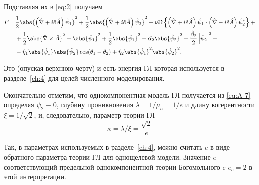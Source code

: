 Подставляя их в \eqref{eq:2} получаем
\begin{align}
  \bar{F} = & \frac{1}{2}\abs{\left( \hat{\nabla} + i\hat{e}\hat{A} \right)
    \hat{\psi}_1}^2 + \frac{1}{2}\abs{\left( \hat{\nabla} + i\hat{e}\hat{A}
    \right)\hat{\psi}_2}^2 - \nu\Re\left\{ \left( \hat{\nabla} + i\hat{e}\hat{A}
    \right) \hat{\psi}_1 \cdot \left( \hat{\nabla} - i\hat{e}\hat{A} \right)
    \hat{\psi}^*_2 \right\} + \nonumber \\
  & + \frac{1}{2}\abs{\hat{\nabla}\times\hat{A}}^2 - \abs{\hat{\psi}_1}^2 +
    \frac{1}{2}\abs{\hat{\psi}_1}^2 - \hat{\alpha_2}\abs{\hat{\psi}_2}^2 +
    \frac{\hat{\beta}_2}{2}\left| \hat{\psi}_2 \right|^2 - \nonumber \\
  & - \hat{\eta}_1\abs{\hat{\psi}_1}\abs{\hat{\psi}_2} \cos(\theta_1 - \theta_2)
    + \hat{\eta}_2\abs{\hat{\psi}_1}^2 \abs{\hat{\psi}_2}^2, \label{eq:A-7}
\end{align}

Это (опуская верхнюю черту) и есть энергия ГЛ которая
используется в разделе~\ref{ch:4} для целей численного моделирования.

Окончательно отметим, что однокомпонентная модель ГЛ получается
из \eqref{eq:A-7} определяя \( \psi_2 \equiv 0 \), глубину проникновения
\( \lambda = 1/\mu_a = 1/e \) и длину когерентности
\( \xi = 1/\sqrt{2} \), и, следовательно, параметр теории ГЛ
\begin{equation}
  \kappa = \lambda/\xi = \frac{\sqrt{2}}{e}
  \label{eq:A-8}
\end{equation}

Так, в параметрах используемых в разделе~\ref{ch:4}, можно считать \( e \) в 
виде обратного параметра теории ГЛ для однощелевой модели. Значение \( e \)
соответствующий предельной однокомпонентной теории Богомольного c
\( e_c = 2 \) в этой интерпретации.
